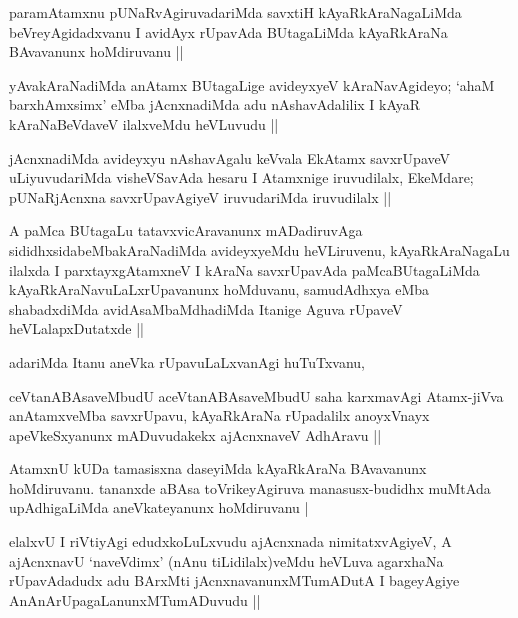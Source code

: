 \begin{artha}
paramAtamxnu pUNaRvAgiruvadariMda savxtiH kAyaRkAraNagaLiMda
beVreyAgidadxvanu I avidAyx rUpavAda BUtagaLiMda kAyaRkAraNa
BAvavanunx hoMdiruvanu ||
\end{artha}

\begin{artha}
yAvakAraNadiMda anAtamx BUtagaLige avideyxyeV kAraNavAgideyo; `ahaM
barxhAmxsimx' eMba jAcnxnadiMda adu nAshavAdalilix I kAyaR
kAraNaBeVdaveV ilalxveMdu heVLuvudu ||
\end{artha}

\begin{artha}
jAcnxnadiMda avideyxyu nAshavAgalu keVvala EkAtamx savxrUpaveV
uLiyuvudariMda visheVSavAda hesaru I Atamxnige iruvudilalx, EkeMdare;
pUNaRjAcnxna savxrUpavAgiyeV iruvudariMda iruvudilalx ||
\end{artha}

\begin{artha}
A paMca BUtagaLu tatavxvicAravanunx mADadiruvAga
sididhxsidabeMbakAraNadiMda avideyxyeMdu heVLiruvenu, kAyaRkAraNagaLu
ilalxda I parxtayxgAtamxneV  I kAraNa savxrUpavAda paMcaBUtagaLiMda
kAyaRkAraNavuLaLxrUpavanunx hoMduvanu, samudAdhxya eMba shabadxdiMda
avidAsaMbaMdhadiMda Itanige Aguva rUpaveV heVLalapxDutatxde ||
\end{artha}

\begin{artha}
adariMda Itanu aneVka rUpavuLaLxvanAgi huTuTxvanu,
\end{artha}


\begin{artha}
ceVtanABAsaveMbudU aceVtanABAsaveMbudU saha karxmavAgi Atamx-jiVva
anAtamxveMba savxrUpavu, kAyaRkAraNa rUpadalilx  anoyxVnayx
apeVkeSxyanunx mADuvudakekx ajAcnxnaveV AdhAravu ||
\end{artha}

\begin{artha}
AtamxnU kUDa tamasisxna daseyiMda kAyaRkAraNa BAvavanunx
hoMdiruvanu. tananxde aBAsa toVrikeyAgiruva manasusx-budidhx muMtAda
upAdhigaLiMda aneVkateyanunx hoMdiruvanu |
\end{artha}

\begin{artha}
elalxvU I riVtiyAgi edudxkoLuLxvudu ajAcnxnada nimitatxvAgiyeV, A
ajAcnxnavU `naveVdimx' (nAnu tiLidilalx)veMdu heVLuva agarxhaNa
rUpavAdadudx adu BArxMti jAcnxnavanunxMTumADutA I bageyAgiye
AnAnArUpagaLanunxMTumADuvudu ||
\end{artha}

